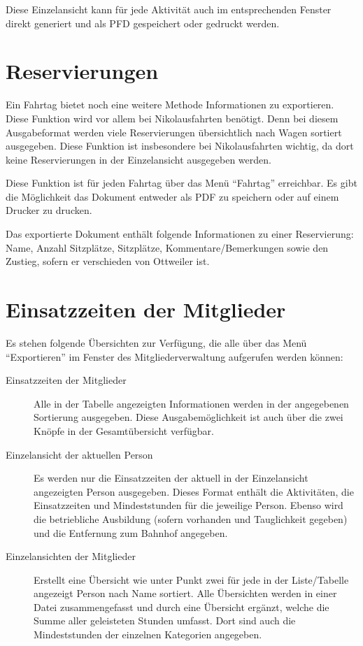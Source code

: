 Diese Einzelansicht kann für jede Aktivität auch im entsprechenden Fenster direkt generiert und als PFD gespeichert oder gedruckt werden.


\section{Reservierungen}
Ein Fahrtag bietet noch eine weitere Methode Informationen zu exportieren.
Diese Funktion wird vor allem bei Nikolausfahrten benötigt.
Denn bei diesem Ausgabeformat werden viele Reservierungen übersichtlich nach Wagen sortiert ausgegeben.
Diese Funktion ist insbesondere bei Nikolausfahrten wichtig, da dort keine Reservierungen in der Einzelansicht ausgegeben werden.

Diese Funktion ist für jeden Fahrtag über das Menü "`Fahrtag"' erreichbar.
Es gibt die Möglichkeit das Dokument entweder als PDF zu speichern oder auf einem Drucker zu drucken.

Das exportierte Dokument enthält folgende Informationen zu einer Reservierung: Name, Anzahl Sitzplätze, Sitzplätze, Kommentare/Bemerkungen sowie den Zustieg, sofern er verschieden von Ottweiler ist.



\section{Einsatzzeiten der Mitglieder}
Es stehen folgende Übersichten zur Verfügung, die alle über das Menü "`Exportieren"' im Fenster des Mitgliederverwaltung aufgerufen werden können:
\begin{description}
  \item[Einsatzzeiten der Mitglieder]
  Alle in der Tabelle angezeigten Informationen werden in der angegebenen Sortierung ausgegeben.
  Diese Ausgabemöglichkeit ist auch über die zwei Knöpfe in der Gesamtübersicht verfügbar.
  \item[Einzelansicht der aktuellen Person]
  Es werden nur die Einsatzzeiten der aktuell in der Einzelansicht angezeigten Person ausgegeben.
  Dieses Format enthält die Aktivitäten, die Einsatzzeiten und Mindeststunden für die jeweilige Person.
  Ebenso wird die betriebliche Ausbildung (sofern vorhanden und Tauglichkeit gegeben) und die Entfernung zum Bahnhof angegeben.
  \item[Einzelansichten der Mitglieder]
  Erstellt eine Übersicht wie unter Punkt zwei für jede in der Liste/Tabelle angezeigt Person nach Name sortiert.
  Alle Übersichten werden in einer Datei zusammengefasst und durch eine Übersicht ergänzt, welche die Summe aller geleisteten Stunden umfasst.
  Dort sind auch die Mindeststunden der einzelnen Kategorien angegeben.
\end{description}



